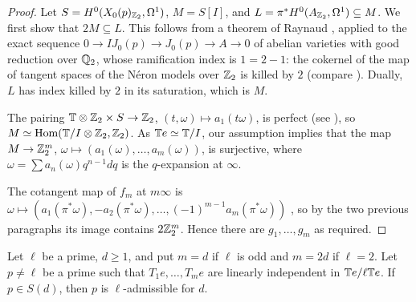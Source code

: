 \begin{proof}
Let $S=H^0(X_0(p)_{\mathbb{Z}_2},\Omega^1)$, $M=S[I]$, and $L=\pi^*H^0(A_{\mathbb{Z}_2},\Omega^1)\subseteq M$. We first show that $2M\subseteq L$. This follows from a theorem of Raynaud \cite[Appendix A, Theorem A.1]{AU}, applied to the exact sequence $0\to IJ_0(p)\to J_0(p)\to A\to 0$ of abelian varieties with good reduction over $\mathbb{Q}_2$, whose ramification index is $1=2-1$: the cokernel of the map of tangent spaces of the N\'eron models over $\mathbb{Z}_2$ is killed by $2$ (compare \cite[Section 4.4]{ARS}). Dually, $L$ has index killed by $2$ in its saturation, which is $M$.

The pairing $\mathbb{T}\otimes\mathbb{Z}_2\times S\to\mathbb{Z}_2$, $(t,\omega)\mapsto a_1(t\omega)$, is perfect (see \cite[Lemma 2.1]{AU}), so $M\simeq\operatorname{Hom}(\mathbb{T}/I\otimes\mathbb{Z}_2,\mathbb{Z}_2)$. As $\mathbb{T} e\simeq\mathbb{T}/I$, our assumption implies that the map $M\to\mathbb{Z}_2^m$, $\omega\mapsto(a_1(\omega),\dots,a_m(\omega))$, is surjective, where $\omega=\sum a_n(\omega)q^{n-1}dq$ is the $q$-expansion at $\infty$.

The cotangent map of $f_m$ at $m\infty$ is $\omega\mapsto(a_1(\pi^*\omega),-a_2(\pi^*\omega),\dots,(-1)^{m-1}a_m(\pi^*\omega))$ \cite[Lemma 4.16]{parentformal}, so by the two previous paragraphs its image contains $2\mathbb{Z}_2^m$. Hence there are $g_1,\dots,g_m$ as required.
\end{proof}

\begin{proposition}\label{prop:dyadic}
Let $\ell$ be a prime, $d\geq1$, and put $m=d$ if $\ell$ is odd and $m=2d$ if $\ell=2$. Let $p\neq\ell$ be a prime such that $T_1e,\dots,T_me$ are linearly independent in $\mathbb{T} e/\ell\mathbb{T} e$. If $p\in S(d)$, then $p$ is $\ell$-admissible for $d$.
\end{proposition}

